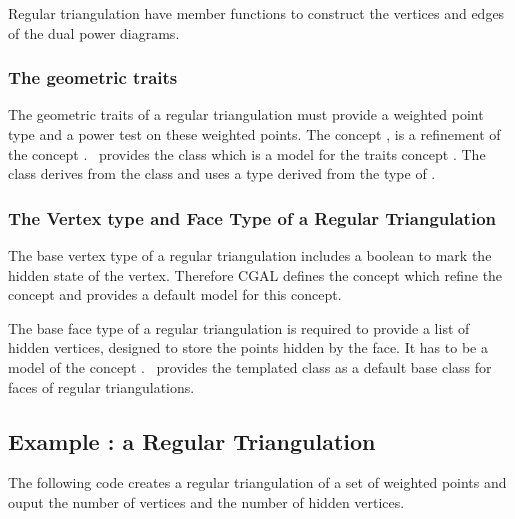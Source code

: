 Regular triangulation have member functions to construct
the vertices and edges of the dual power diagrams.

\subsubsection{The geometric traits}
The geometric traits of a regular triangulation
must provide a weighted point type
and a power test on these weighted points.
The concept 
,
is a refinement of the concept
. \cgal\ provides 
the class
which is a model for the traits concept
.
The class 
derives  from the class
and uses a  type
derived from the type  of
.

\subsubsection{The Vertex type and Face Type of a Regular Triangulation}

The base vertex type of a regular triangulation
includes a boolean to mark the hidden state of the vertex.
Therefore  CGAL defines the concept
 which refine
the concept 
and provides a default model 
for this concept.

The base face type of a regular triangulation
is required to provide a list of hidden vertices,
designed to store the points hidden by the face. It has to be a model
of the concept .
\cgal\ provides the templated class 
as a default base class for faces of regular triangulations.



\subsection{Example : a Regular Triangulation}
\label{Subsection_2D_Triangulations_Regular_Example}

The following code  creates a regular triangulation 
of a set of weighted points and ouput the number
of vertices and the number of hidden vertices.



